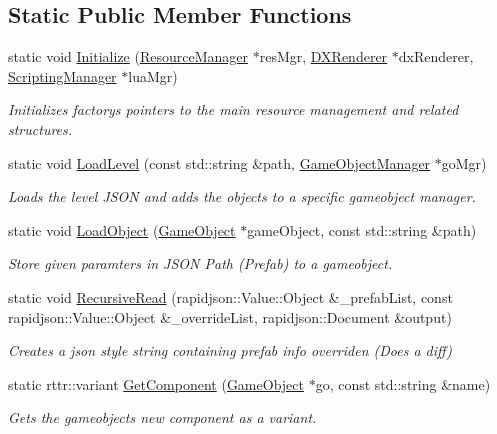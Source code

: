 \subsection*{Static Public Member Functions}
\begin{DoxyCompactItemize}
\item 
static void \hyperlink{classFactory_afd40f0b1d5fe75186a2944631230dddb}{Initialize} (\hyperlink{classResourceManager}{Resource\+Manager} $\ast$res\+Mgr, \hyperlink{classDXRenderer}{D\+X\+Renderer} $\ast$dx\+Renderer, \hyperlink{classScriptingManager}{Scripting\+Manager} $\ast$lua\+Mgr)
\begin{DoxyCompactList}\small\item\em Initializes factory\textquotesingle{}s pointers to the main resource management and related structures. \end{DoxyCompactList}\item 
static void \hyperlink{classFactory_acecab843937734cf968a4e2442730280}{Load\+Level} (const std\+::string \&path, \hyperlink{classGameObjectManager}{Game\+Object\+Manager} $\ast$go\+Mgr)
\begin{DoxyCompactList}\small\item\em Loads the level J\+S\+ON and adds the objects to a specific gameobject manager. \end{DoxyCompactList}\item 
static void \hyperlink{classFactory_a6c46f123c98e70e2488770260c3d4457}{Load\+Object} (\hyperlink{classGameObject}{Game\+Object} $\ast$game\+Object, const std\+::string \&path)
\begin{DoxyCompactList}\small\item\em Store given paramters in J\+S\+ON Path (Prefab) to a gameobject. \end{DoxyCompactList}\item 
static void \hyperlink{classFactory_af361a76e22b9f0a35dde7d78267816c2}{Recursive\+Read} (rapidjson\+::\+Value\+::\+Object \&\+\_\+prefab\+List, const rapidjson\+::\+Value\+::\+Object \&\+\_\+override\+List, rapidjson\+::\+Document \&output)
\begin{DoxyCompactList}\small\item\em Creates a json style string containing prefab info overriden (Does a diff) \end{DoxyCompactList}\item 
static rttr\+::variant \hyperlink{classFactory_ab82e64c1c79db2e80e7110fbd2ed180c}{Get\+Component} (\hyperlink{classGameObject}{Game\+Object} $\ast$go, const std\+::string \&name)
\begin{DoxyCompactList}\small\item\em Gets the gameobject\textquotesingle{}s new component as a variant. \end{DoxyCompactList}\end{DoxyCompactItemize}

